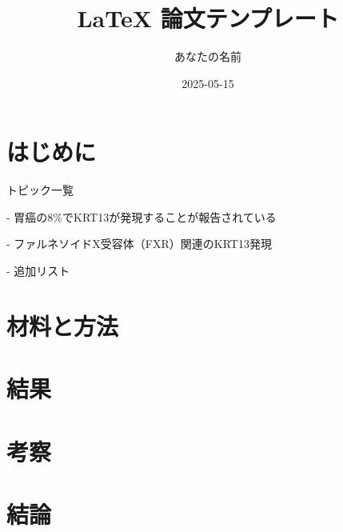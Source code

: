 \documentclass[lualatex,ja=standard]{bxjsarticle}
\begin{document}
\title{LaTeX 論文テンプレート}
\author{あなたの名前}
\date{2025-05-15}

\maketitle

\section{はじめに}

トピック一覧

- 胃癌の8\%でKRT13が発現することが報告されている\cite{lennartzCytokeratin13CK132023}

- ファルネソイドX受容体（FXR）関連のKRT13発現\cite{lianFarnesoidReceptorProtects2011}

- 追加リスト

\section{材料と方法}

\section{結果}

\section{考察}

\section{結論}


\end{document}
